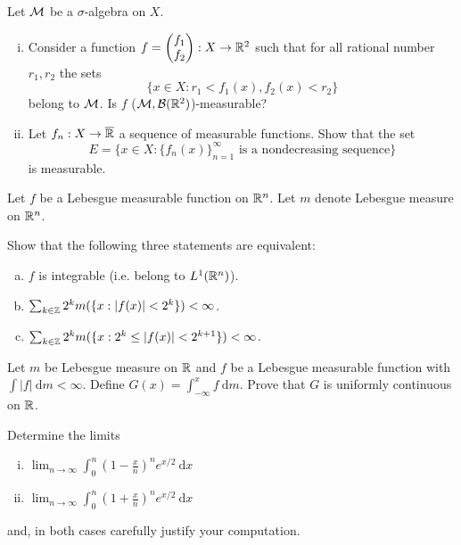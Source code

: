 \begin{problem}
  Let $\mathcal M$ be a $\sigma$-algebra on $X$.
  \begin{enumerate}[(i)]
    \item Consider a function $f = \begin{pmatrix}
      f_1\\
      f_2
    \end{pmatrix} : X \to \mathbb R^2$ such that for all rational number $r_1, r_2$ the sets
    \[\{x \in X : r_1 < f_1(x), f_2(x) < r_2\}\]
    belong to $\mathcal M$. Is $f$ ($\mathcal M, \mathcal{B}(\mathbb R^2)$)-measurable?
    \item Let $f_n : X \to \overline{\mathbb R}$ a sequence of measurable functions. Show that the set
    \[E = \{x \in X : \{f_n(x)\}_{n=1}^\infty \text{ is a nondecreasing sequence}\}\]
    is measurable.
  \end{enumerate} 
\end{problem}
\begin{problem}
  Let $f$ be a Lebesgue measurable function on $\mathbb R^n$. Let $m$ denote Lebesgue measure on $\mathbb R^n$.

  Show that the following  three statements are equivalent:
  \begin{enumerate}[(a)]
    \item $f$ is integrable (i.e. belong to $L^1(\mathbb R^n)$).
    \item $\sum_{k \in \mathbb Z} 2^km(\{x : |f(x)| < 2^k\}) < \infty$.
    \item $\sum_{k \in \mathbb Z} 2^km(\{x : 2^k \le |f(x)| < 2^{k+1}\}) < \infty$.
  \end{enumerate}
\end{problem}
\begin{problem}
  Let $m$ be Lebesgue measure on $\mathbb R$ and $f$ be a Lebesgue measurable function with $\int |f|\ \mathrm{d}m < \infty$. 
  Define $G(x) = \int_{-\infty}^x f\ \mathrm{d}m$. Prove that $G$ is uniformly continuous on $\mathbb R$.
\end{problem}
\begin{problem}
  Determine the limits 
  \begin{enumerate}[(i)]
    \item $\lim_{n\to\infty} \int_0^n (1 - \frac xn)^n e^{x/2}\ \mathrm{d}x$
    \item $\lim_{n\to\infty} \int_0^n (1 + \frac xn)^n e^{x/2}\ \mathrm{d}x$
  \end{enumerate}
  and, in both cases carefully justify your computation.
\end{problem}
